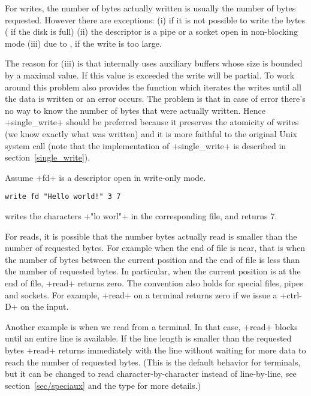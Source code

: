 For writes, the number of bytes actually written is usually the number
of bytes requested. However there are exceptions: (i) if it is not
possible to write the bytes (\eg{} if the disk is full) (ii) the
descriptor is a pipe or a socket open in non-blocking mode (iii) due to
{\ocaml}, if the write is too large.

The reason for (iii) is that internally {\ocaml} uses auxiliary
buffers whose size is bounded by a maximal value. If this value is
exceeded the write will be partial. To work around this problem
{\ocaml} also provides the function  which
iterates the writes until all the data is written or an error occurs.
The problem is that in case of error there's no way to know the number
of bytes that were actually written. Hence \ml+single_write+ should be
preferred because it preserves the atomicity of writes (we know
exactly what was written) and it is more faithful to the original Unix
system call (note that the implementation of \ml+single_write+ is
described in section~\ref{single_write}).

  
\begin{example} 
Assume \ml+fd+ is a descriptor open in write-only mode. 
%
\begin{lstlisting}
write fd "Hello world!" 3 7
\end{lstlisting}
%
writes the characters \ml+"lo worl"+ in the corresponding file,
and returns 7.
\end{example}

For reads, it is possible that the number bytes actually read is
smaller than the number of requested bytes. For example when the end
of file is near, that is when the number of bytes between the current
position and the end of file is less than the number of requested
bytes. In particular, when the current position is at the end of file,
\ml+read+ returns zero. The convention  also holds for special files, pipes and sockets. For example,
\ml+read+ on a terminal returns zero if we issue a \ml+ctrl-D+ on the
input.

Another example is when we read from a terminal. In that case,
\ml+read+ blocks until an entire line is available. If the line length
is smaller than the requested bytes \ml+read+ returns immediately with
the line without waiting for more data to reach the number of
requested bytes. (This is the default behavior for terminals, but it
can be changed to read character-by-character instead of
line-by-line, see section~\ref{sec/speciaux} and the type
 for more details.)

